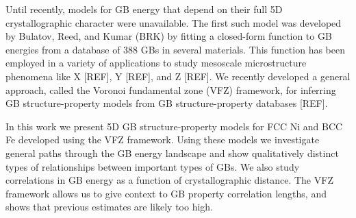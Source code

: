 \documentclass[final,twocolumn,12pt]{elsarticle}
\begin{document}
	Until recently, models for GB energy that depend on their full 5D crystallographic character were unavailable. The first such model was developed by Bulatov, Reed, and Kumar (BRK) \cite{bulatovGrainBoundaryEnergy2014} by fitting a closed-form function to GB energies from a database \cite{olmstedSurveyComputedGrain2009a} of 388 GBs in several materials. This function has been employed in a variety of applications to study mesoscale microstructure phenomena like X [REF], Y [REF], and Z [REF]. We recently developed a general approach, called the Voronoi fundamental zone (VFZ) framework, for inferring GB structure-property models from GB structure-property databases [REF]. 
	
	In this work we present 5D GB structure-property models for FCC Ni and BCC Fe developed using the VFZ framework. Using these models we investigate general paths through the GB energy landscape and show qualitatively distinct types of relationships between important types of GBs. We also study correlations in GB energy as a function of crystallographic distance. The VFZ framework allows us to give context to GB property correlation lengths, and shows that previous estimates are likely too high.
	
	
	
	

	
\end{document}
